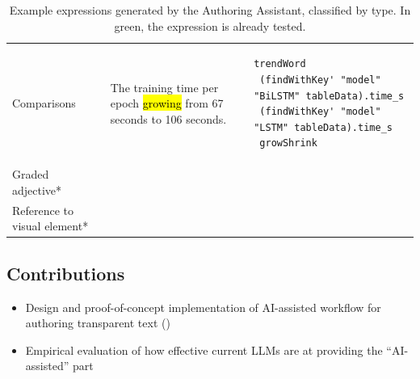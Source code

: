 \begin{table}[!ht]
\begin{tabular}{>{\raggedright\arraybackslash}p{2cm} >{\raggedright\arraybackslash}p{5cm} >{\raggedright\arraybackslash}p{6cm}}
        Comparisons
        & The training time per epoch \hl{growing} from 67 seconds to 106 seconds. &
        \begin{lstlisting}[language=Fluid,numbers=none]
trendWord
 (findWithKey' "model" "BiLSTM" tableData).time_s
 (findWithKey' "model" "LSTM" tableData).time_s
 growShrink
        \end{lstlisting} \\
        Graded adjective*            & ~                & ~                             \\
        Reference to visual element*                            & ~                & ~                             \\
        \bottomrule
    \end{tabular}
    \caption{Example expressions generated by the Authoring Assistant, classified by type. In green, the expression is already tested.}
    \label{tab:fluid_examples}
\end{table}
\subsection{Contributions}

\begin{itemize}
    \item Design and proof-of-concept implementation of AI-assisted workflow for authoring transparent text
    ()
    \item Empirical evaluation of how effective current LLMs are at providing the ``AI-assisted'' part
\end{itemize}
